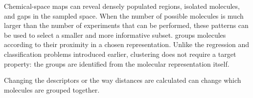 Chemical-space maps can reveal densely populated regions, isolated molecules, and gaps in the sampled space.
When the number of possible molecules is much larger than the number of experiments that can be performed, these patterns can be used to select a smaller and more informative subset.
 groups molecules according to their proximity in a chosen representation.
Unlike the regression and classification problems introduced earlier, clustering does not require a target property: the groups are identified from the molecular representation itself.

\begin{conceptbox}
  Changing the descriptors or the way distances are calculated can change which molecules are grouped together.
\end{conceptbox}

